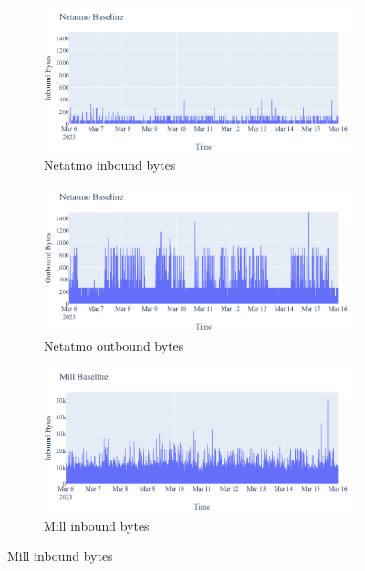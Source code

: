 \begin{figure}[H]
    \centering
    \begin{subfigure}[b]{0.4\textwidth}
        \includegraphics[width=\textwidth]{figures/Netatmo_Baseline_InboundBytes.png}
        \caption{Netatmo inbound bytes}
    \end{subfigure}
    \begin{subfigure}[b]{0.4\textwidth}
        \includegraphics[width=\textwidth]{figures/Netatmo_Baseline_OutboundBytes.png}
        \caption{Netatmo outbound bytes}
    \end{subfigure}
    \begin{subfigure}[b]{0.4\textwidth}
        \includegraphics[width=\textwidth]{figures/Mill_Baseline_InboundBytes.png}
        \caption{Mill inbound bytes}

\end{subfigure}
\end{figure}
